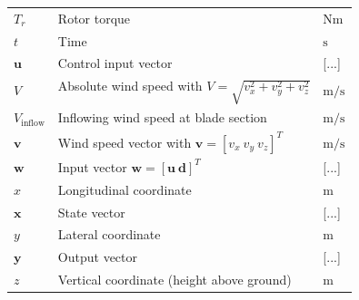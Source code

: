 \begin{longtable}{lll}
    $T_r$ & Rotor torque & $\mathrm{Nm}$ \\
    $t$ & Time & $\mathrm{s}$ \\
    $\bm{u}$ & Control input vector & [...] \\
    $V$ & Absolute wind speed with $V = \sqrt{v_x^2 + v_y^2 + v_z^2}$& $\mathrm{m/s}$ \\
    $V_{\text{inflow}}$ & Inflowing wind speed at blade section &  $\mathrm{m/s}$\\
    $\bm{v}$ & Wind speed vector with $\bm{v} = [v_x\ v_y\ v_z]^T$ & $\mathrm{m/s}$ \\
    $\bm{w}$ & Input vector $\bm{w}=[\bm{u}\ \bm{d}]^T$  & [...] \\
    $x$ & Longitudinal coordinate & $\mathrm{m}$ \\
    $\bm{x}$ & State vector & [...] \\
    $y$ & Lateral coordinate & $\mathrm{m}$ \\
    $\bm{y}$ & Output vector & [...] \\
    $z$ & Vertical coordinate (height above ground) & $\mathrm{m}$ \\
\end{longtable}
\endgroup

\vspace{0.05cm}

